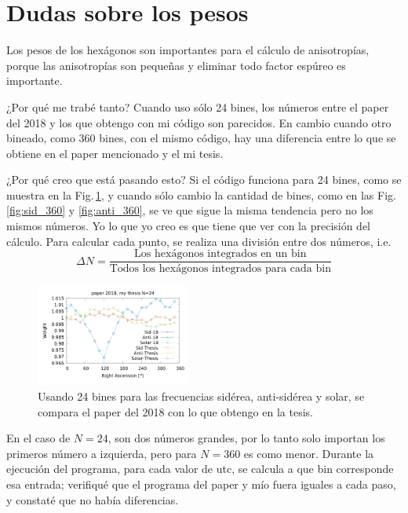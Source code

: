 
\section{Dudas sobre los pesos}

Los pesos de los hexágonos son importantes para el cálculo de anisotropías, porque las anisotropías son pequeñas y eliminar todo factor espúreo es importante.

¿Por qué me trabé tanto? Cuando uso sólo 24 bines, los números entre el paper del 2018 y los que obtengo con mi código son parecidos. En cambio cuando otro bineado, como 360 bines, con el mismo código, hay una diferencia entre lo que se obtiene en el paper mencionado y el mi tesis.

¿Por qué creo que está pasando esto? Si el código funciona para 24 bines, como se muestra en la Fig.\,\ref{fig:all_24}, y cuando sólo cambio la cantidad de bines, como en las Fig.\,\ref{fig:sid_360} y \ref{fig:anti_360}, se ve que sigue la misma tendencia pero no los mismos números. Yo lo que yo creo es que tiene que ver con la precisión del cálculo. Para calcular cada punto, se realiza una división entre dos números, i.e. 
\begin{equation}
	\Delta N = \frac{\text{Los hexágonos integrados en un bin}}{\text{Todos los hexágonos integrados para cada bin}}
\end{equation}


\begin{figure}[H]
	\centering
	\includegraphics[width=0.45\textwidth]{Graficos/solar_anti_sid_my_and_paper_in_24.png}
	\caption{Usando 24 bines para las frecuencias sidérea, anti-sidérea y solar, se compara el paper del 2018 con lo que obtengo en la tesis.}
	\label{fig:all_24}
\end{figure}


En el caso de $N=24$, son dos números grandes, por lo tanto solo importan los primeros número a izquierda, pero para  $N=360$ es como menor. Durante la ejecución del programa, para cada valor de utc, se calcula a que bin corresponde esa entrada; verifiqué que el programa del paper y mío fuera iguales a cada paso, y constaté que no había diferencias.


